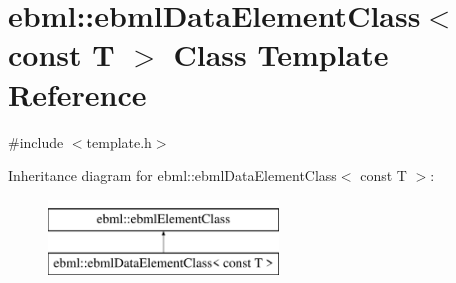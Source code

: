 \hypertarget{classebml_1_1ebmlDataElementClass_3_01const_01T_01_4}{}\section{ebml\+:\+:ebml\+Data\+Element\+Class$<$ const T $>$ Class Template Reference}
\label{classebml_1_1ebmlDataElementClass_3_01const_01T_01_4}


{\ttfamily \#include $<$template.\+h$>$}

Inheritance diagram for ebml\+:\+:ebml\+Data\+Element\+Class$<$ const T $>$\+:\begin{figure}[H]
\begin{center}
\leavevmode
\includegraphics[height=2.000000cm]{classebml_1_1ebmlDataElementClass_3_01const_01T_01_4}
\end{center}
\end{figure}
